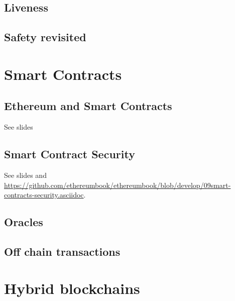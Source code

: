 \documentclass[a4paper,11pt]{report}
\begin{document}
	\section{Liveness}
	\label{sec:live}
	
	
	\section{Safety revisited}
	\label{sec:safe2}
	

\chapter{Smart Contracts}

	\section{Ethereum and Smart Contracts}
	See slides 

	\section{Smart Contract Security}
	See slides and \url{https://github.com/ethereumbook/ethereumbook/blob/develop/09smart-contracts-security.asciidoc}.
	
	\section{Oracles}
	
	\section{Off chain transactions}

\chapter{Hybrid blockchains}
	\label{ch:hybrid}
	
\end{document}

